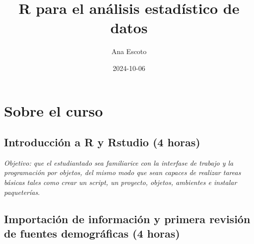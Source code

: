 \documentclass[
  letterpaper,
  DIV=11,
  numbers=noendperiod]{scrreprt}
\title{R para el análisis estadístico de datos}
\author{Ana Escoto}
\date{2024-10-06}
\renewcommand*\contentsname{Table of contents}
\newcommand\contentsname{Table of contents}
\begin{document}
\maketitle
\ifdefined\Shaded\renewenvironment{Shaded}{\begin{tcolorbox}[interior hidden, sharp corners, frame hidden, borderline west={3pt}{0pt}{shadecolor}, enhanced, breakable, boxrule=0pt]}{\end{tcolorbox}}\fi

\renewcommand*\contentsname{Table of contents}
{
\hypersetup{linkcolor=}
\setcounter{tocdepth}{2}
\tableofcontents
}

\hypertarget{sobre-el-curso}{%
\chapter*{Sobre el curso}\label{sobre-el-curso}}


\hypertarget{introducciuxf3n-a-r-y-rstudio-4-horas}{%
\section*{Introducción a R y Rstudio (4
horas)}\label{introducciuxf3n-a-r-y-rstudio-4-horas}}


\emph{Objetivo: que el estudiantado sea familiarice con la interfase de
trabajo y la programación por objetos, del mismo modo que sean capaces
de realizar tareas básicas tales como crear un script, un proyecto,
objetos, ambientes e instalar paqueterías}.

\hypertarget{importaciuxf3n-de-informaciuxf3n-y-primera-revisiuxf3n-de-fuentes-demogruxe1ficas-4-horas}{%
\section*{Importación de información y primera revisión de fuentes
demográficas (4
horas)}\label{importaciuxf3n-de-informaciuxf3n-y-primera-revisiuxf3n-de-fuentes-demogruxe1ficas-4-horas}}

\end{document}

